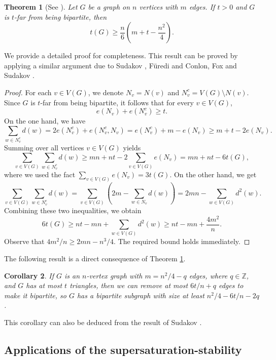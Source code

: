\documentclass[11pt]{article}
\newtheorem{theorem}{Theorem}[section]
\newtheorem{corollary}[theorem]{Corollary}
\begin{document}
\begin{theorem}[See \cite{BBCLMS2017}] \label{thm-far-bipartite}  
Let $G$ be a graph on $n$ vertices with $m$ edges. 
 If $t> 0$ and $G$ is $t$-far from being bipartite, then 
\[ t(G) \ge \frac{n}{6}\left( m +t-\frac{n^2}{4}\right).  \] 
\end{theorem}  

We provide a detailed proof for completeness. 
This result can be proved by applying a similar argument 
due to  Sudakov \cite{Sud2007}, F\"{u}redi \cite{Fur2015} and Conlon, Fox and Sudakov \cite{CFS2020-Siam}. 



\begin{proof} 
 For each $v \in V(G)$, we denote $N_v=N(v)$ 
 and $N_v^c=V(G)\setminus N(v)$.  
Since $G$ is $t$-far from being bipartite, it follows  that 
for every $v\in V(G)$, 
\[  e(N_v) + e(N_v^c) \ge t . \] 
On the one hand, we have 
\[  \sum_{w\in N_v^c} d(w) = 2e(N_v^c) + e(N_v^c,N_v) 
= e(N_v^c) + m - e(N_v) 
\ge m+t-2e(N_v).  
  \]
Summing over all vertices $v\in V(G)$ yields 
  \[  \sum_{v\in V(G)} \sum_{w\in N_v^c} d(w) 
  \ge mn +nt - 2 \sum_{v\in V(G)} e(N_v) = 
  mn +nt - 6t(G), \]
  where we used the fact $\sum_{v\in V(G)}e(N_v) = 3t(G)$. 
 On the other hand, we get  
\[ \sum_{v\in V(G)} \sum_{w\in N_v^c} d(w)= 
\sum_{v\in V(G)} \left( 2m - \sum_{w\in N_v}d(w) \right) 
= 2mn - \sum_{w\in V(G)} d^2(w). \]
Combining these two inequalities, 
we obtain 
\[  6t(G) 
\ge nt- mn + \sum_{w\in V(G)} d^2(w) 
\ge nt-mn + \frac{4m^2}{n}. \]
Observe that  
${4m^2}/{n} \ge 2mn - {n^3}/{4}$. 
The required bound holds immediately. 
\end{proof}


The following result is a direct consequence of Theorem \ref{thm-far-bipartite}. 

\begin{corollary}  \label{coro-bip}
If $G$ is an $n$-vertex graph with $m = {n^2}/{4} -q$ edges, where $q\in \mathbb{Z}$, 
and $G$ has at most $t$ triangles, then we can remove at most  
${6t}/{n} +q$ edges to make it bipartite, so $G$ has a bipartite 
subgraph with size at least ${n^2}/{4}  - {6t}/{n} -2q$. 
\end{corollary}


This corollary can also be deduced from 
the result of Sudakov \cite[Lemma 2.3]{Sud2007}. 






\subsection{Applications of the supersaturation-stability}
\end{document}
